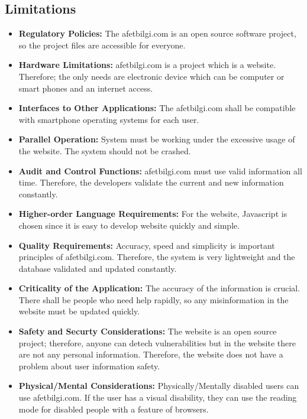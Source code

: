 \subsection{Limitations}
\begin{itemize}
    \item \textbf{Regulatory Policies: } The afetbilgi.com is an open source software project, so the project files are accessible for everyone.
    \item \textbf{Hardware Limitations: } afetbilgi.com is a project which is a website. Therefore; the only needs are electronic device which can be computer or smart phones and an internet access. 
    \item \textbf{Interfaces to Other Applications: } The afetbilgi.com shall be compatible with smartphone operating systems for each user.
    \item \textbf{Parallel Operation: } System must be working under the excessive usage of the website. The system should not be crashed.
    \item \textbf{Audit and Control Functions: } afetbilgi.com must use valid information all time. Therefore, the developers validate the current and new information constantly.  
    \item \textbf{Higher-order Language Requirements: } For the website, Javascript is chosen since it is easy to develop website quickly and simple. 
    \item \textbf{Quality Requirements: } Accuracy, speed and simplicity is important principles of afetbilgi.com. Therefore, the system is very lightweight and the database validated and updated constantly.
    \item \textbf{Criticality of the Application: } The accuracy of the information is crucial. There shall be people who need help rapidly, so any misinformation in the website must be updated quickly.
    \item \textbf{Safety and Securty Considerations: } The website is an open source project; therefore, anyone can detech vulnerabilities but in the website there are not any personal information. Therefore, the website does not have a problem about user information safety. 
    \item \textbf{Physical/Mental Considerations: } Physically/Mentally disabled users can use afetbilgi.com. If the user has a visual disability, they can use the reading mode for disabled people with a feature of browsers. 
\end{itemize}
